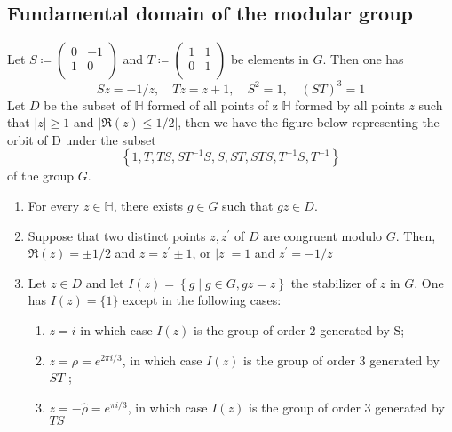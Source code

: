 \documentclass[12pt]{article}
\theoremstyle{definition}
\begin{document}
    \subsection{Fundamental domain of the modular group}
    Let \(S\coloneqq \begin{pmatrix}
        0 &  -1 \\
        1 & 0 \\
    \end{pmatrix} \) and \(T\coloneqq \begin{pmatrix}
        1 &  1 \\
        0 &  1 \\
    \end{pmatrix}\) be elements in \(G\). Then one has
    \[
        Sz = -1/z,\quad Tz=z+1,\quad S^2 =1,\quad (ST)^3=1
    \] 
    Let \(D\) be the subset of \(\mathbb{H} \) formed of all points of z \(\mathbb{H} \) formed by all points \(z\) such that \(\vert z \vert \geq 1 \)  and \(\vert \Re(z) \leq 1/2 \vert \), then we have the figure below representing the orbit of D under the subset \[\left\{1,T,TS,ST^{-1}S, S, ST, STS, T^{-1}S, T^{-1}  \right\}\] of the group \(G\).
    \begin{thm}[label=thm2]
    \begin{enumerate}
        \item For every \(z\in \mathbb{H} \), there exists \(g \in G\) such that \(gz\in D\).
        \item Suppose that two distinct points \(z,z^{\prime} \)  of \(D\) are congruent modulo \(G\). Then, \(\Re(z) = \pm 1/2\) and \(z=z^{\prime} \pm 1\), or \(\vert z \vert =1\) and \(z^{\prime} =-1/z\) 
        \item Let \(z\in D\) and let \(I(z)=\left\{g \mid g\in G, gz=z \right\}\) the stabilizer of \(z\) in \(G\). One has \(I(z)=\{1\}\) except in the following cases:
        \begin{enumerate}[label=(\alph*)]
            \item \(z=i\) in which case \(I(z)\) is the group of order \(2\) generated by S;
            \item \(z=\rho = e^{2\pi i/3}\), in which case \(I(z)\) is the group of order \(3\) generated by \(ST\) ;
            \item \(z=-\hat{\rho} = e^{\pi i/3}\), in which case \(I(z)\) is the group of order \(3\) generated by \(TS\)
        \end{enumerate}
    \end{enumerate}
    \end{thm}
    
\end{document}
